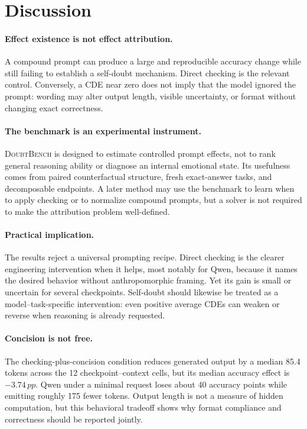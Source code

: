 \documentclass[sigconf]{acmart}
\newcommand{\bench}{\textsc{DoubtBench}}
\newcommand{\pp}{\,pp}
\newcommand{\revision}[1]{\textcolor{revisionred}{#1}}
\begin{document}
\section{Discussion}

\paragraph{Effect existence is not effect attribution.}
A compound prompt can produce a large and reproducible accuracy change while
still failing to establish a self-doubt mechanism. Direct checking is the
relevant control. Conversely, a CDE near zero does not imply that the model
ignored the prompt: wording may alter output length, visible uncertainty, or
format without changing exact correctness.

\paragraph{The benchmark is an experimental instrument.}
\bench{} is designed to estimate controlled prompt effects, not to rank general
reasoning ability or diagnose an internal emotional state. Its usefulness
comes from paired counterfactual structure, fresh exact-answer tasks, and
decomposable endpoints. A later method may use the benchmark to learn when to
apply checking or to normalize compound prompts, but a solver is not required
to make the attribution problem well-defined.

\paragraph{Practical implication.}
\revision{The results reject a universal prompting recipe. Direct checking is
the clearer engineering intervention when it helps, most notably for Qwen,
because it names the desired behavior without anthropomorphic framing. Yet its
gain is small or uncertain for several checkpoints. Self-doubt should likewise
be treated as a model--task-specific intervention: even positive average CDEs
can weaken or reverse when reasoning is already requested.}

\paragraph{\revision{Concision is not free.}}
\revision{The checking-plus-concision condition reduces generated output by a
median 85.4 tokens across the 12 checkpoint--context cells, but its median
accuracy effect is $-3.74\pp$. Qwen under a minimal request loses about 40
accuracy points while emitting roughly 175 fewer tokens. Output length is not
a measure of hidden computation, but this behavioral tradeoff shows why format
compliance and correctness should be reported jointly.}
\end{document}
